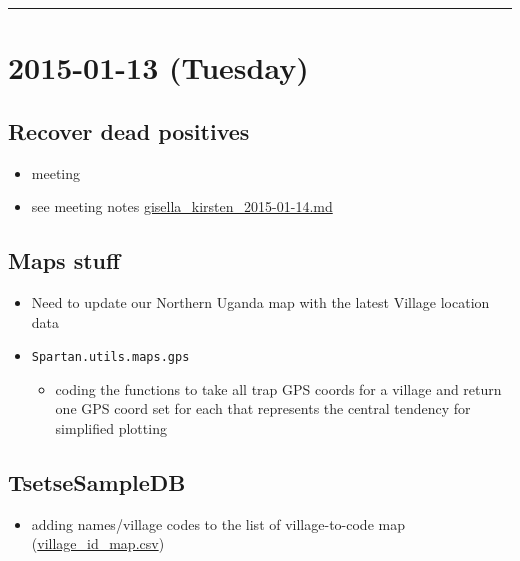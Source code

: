 \documentclass[letterpaper]{scrartcl}
\begin{document}
\begin{center}\rule{0.5\linewidth}{\linethickness}\end{center}

\section{2015-01-13 (Tuesday)}\label{tuesday-1}

\subsection{Recover dead positives}\label{recover-dead-positives-4}

\begin{itemize}
\itemsep1pt\parskip0pt
\item
  meeting
\item
  see meeting notes
  \href{file:///home/gus/Dropbox/repos/git/markdown-docs/notes/meetings/gisella_kirsten_2015-01-14/gisella_kirsten_2015-01-14.md}{gisella\_kirsten\_2015-01-14.md}
\end{itemize}

\subsection{Maps stuff}\label{maps-stuff}

\begin{itemize}
\itemsep1pt\parskip0pt
\item
  Need to update our Northern Uganda map with the latest Village
  location data
\item
  \texttt{Spartan.utils.maps.gps}

  \begin{itemize}
  \itemsep1pt\parskip0pt
  \item
    coding the functions to take all trap GPS coords for a village and
    return one GPS coord set for each that represents the central
    tendency for simplified plotting
  \end{itemize}
\end{itemize}

\subsection{TsetseSampleDB}\label{tsetsesampledb}

\begin{itemize}
\itemsep1pt\parskip0pt
\item
  adding names/village codes to the list of village-to-code map
  (\href{file:///home/gus/Dropbox/repos/git/TsetseCheckout/TsetseCheckout/data/village_id_map.csv}{village\_id\_map.csv})
\end{itemize}
\end{document}
